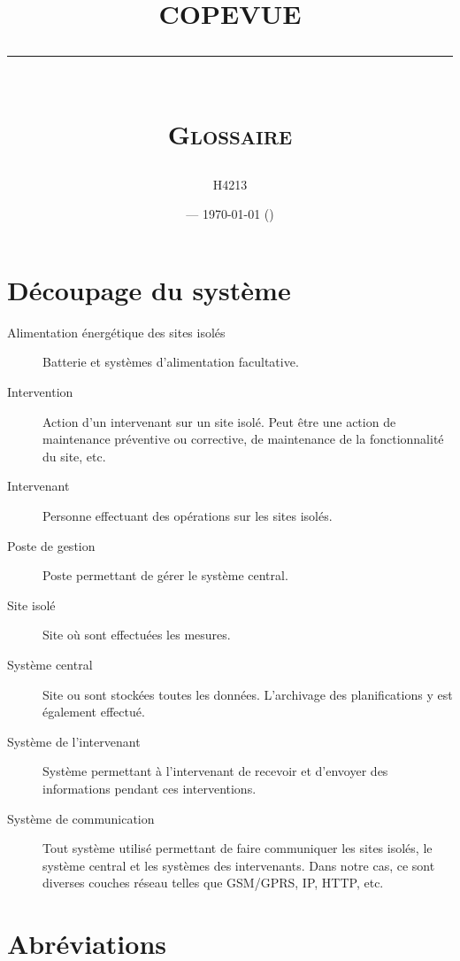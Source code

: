 \documentclass[a4paper, 11pt, final]{article}
\title{\textbf{COPEVUE}\\
\rule{\textwidth}{1pt}{}\\
\Huge{\textsc{Glossaire}}}
\author{H4213}
\date{\docname{} --- \today{} (\docstatus{})}
\begin{document}
\maketitle

\section{Découpage du système}

\begin{description}
\item[Alimentation énergétique des sites isolés]
Batterie et systèmes d'alimentation facultative.
\item[Intervention]
Action d'un intervenant sur un site isolé. Peut être une action de
maintenance préventive ou corrective, de maintenance de la
fonctionnalité du site, etc.
\item[Intervenant]
Personne effectuant des opérations sur les sites isolés.
\item[Poste de gestion]
Poste permettant de gérer le système central.
\item[Site isolé]
Site où sont effectuées les mesures.
\item[Système central]
Site ou sont stockées toutes les données. L'archivage des
planifications y est également effectué.
\item[Système de l'intervenant]
Système permettant à l'intervenant de recevoir et d'envoyer des informations pendant ces interventions.
\item[Système de communication]
Tout système utilisé permettant de faire communiquer les sites isolés,
le système central et les systèmes des intervenants. Dans notre cas,
ce sont diverses couches réseau telles que GSM/GPRS, IP, HTTP, etc.
\end{description}

\section{Abréviations}
\end{document}
